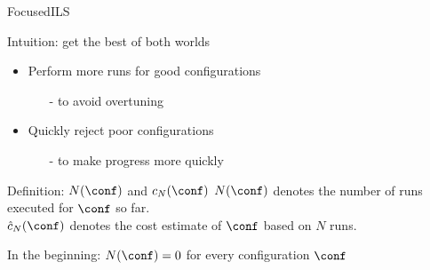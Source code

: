 \begin{frame}[c,fragile]{FocusedILS}

Intuition: get the best of both worlds
\begin{itemize}
	\item Perform more runs for good configurations
	\begin{itemize}
	  \item[-] to avoid overtuning
	\end{itemize}
	\item Quickly reject poor configurations
	\begin{itemize}
	  \item[-] to make progress more quickly
	\end{itemize}
\end{itemize}

\pause

\begin{block}{Definition: $N(\conf)$ and $c_N(\conf)$}
\alert{$N(\conf)$} denotes the number of runs executed for $\conf$ so far.\\
\alert{$\hat{c}_N(\conf)$} denotes the cost estimate of $\conf$ based on $N$ runs.
\end{block}

\pause
In the beginning: $N(\conf)=0$ for every configuration $\conf$

\end{frame}




